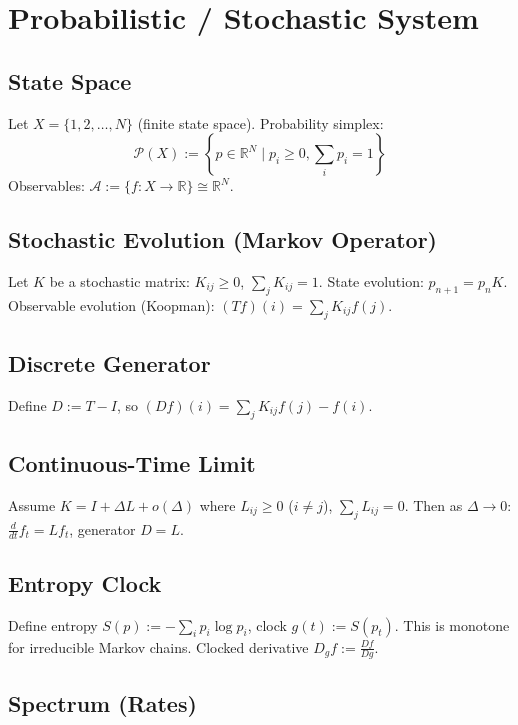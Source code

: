 \documentclass[12pt, oneside]{article}
\begin{document}
\section{Probabilistic / Stochastic System}

\subsection{State Space}

Let $X = \{1,2,\ldots,N\}$ (finite state space). Probability simplex:
\begin{equation}
\mathcal{P}(X) := \left\{ p \in \mathbb{R}^N \mid p_i \geq 0, \sum_i p_i = 1 \right\}
\end{equation}
Observables: $\mathcal{A} := \{ f: X \rightarrow \mathbb{R} \} \cong \mathbb{R}^N$.

\subsection{Stochastic Evolution (Markov Operator)}

Let $K$ be a stochastic matrix: $K_{ij} \geq 0$, $\sum_j K_{ij} = 1$. State evolution: $p_{n+1} = p_n K$. Observable evolution (Koopman): $(Tf)(i) = \sum_j K_{ij} f(j)$.

\subsection{Discrete Generator}

Define $D := T - I$, so $(Df)(i) = \sum_j K_{ij} f(j) - f(i)$.

\subsection{Continuous-Time Limit}

Assume $K = I + \Delta L + o(\Delta)$ where $L_{ij} \geq 0$ ($i \neq j$), $\sum_j L_{ij} = 0$. Then as $\Delta \to 0$: $\frac{d}{dt} f_t = L f_t$, generator $D = L$.

\subsection{Entropy Clock}

Define entropy $S(p) := -\sum_i p_i \log p_i$, clock $g(t) := S(p_t)$. This is monotone for irreducible Markov chains. Clocked derivative $D_g f := \frac{Df}{Dg}$.

\subsection{Spectrum (Rates)}
\end{document}
